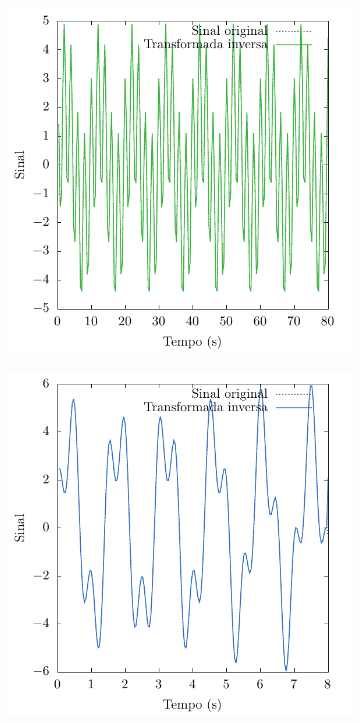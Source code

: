\documentclass[a4paper, 11pt]{article}
\begin{document}
\begin{figure}[h!]
\begin{subfigure}{0.40\textwidth}
    \end{subfigure}
    \begin{subfigure}{0.40\textwidth}
        \centering
        \includegraphics[width=\textwidth]{inv-dft-D}
    \end{subfigure}
    \begin{subfigure}{0.40\textwidth}
        \centering
        \includegraphics[width=\textwidth]{inv-dft-E}

\end{subfigure}
\end{figure}
\end{document}
